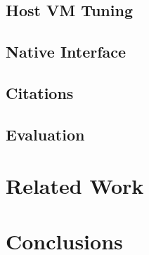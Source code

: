 \documentclass{acm_proc_article-sp}
\begin{document}
\subsection{Host VM Tuning}

\subsection{Native Interface}

\subsection{Citations}

\subsection{Evaluation}

\section{Related Work}

\section{Conclusions}


\end{document}
